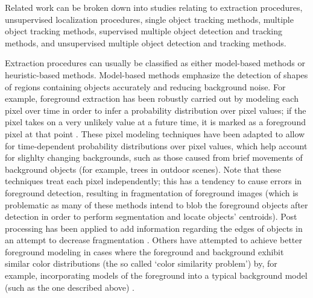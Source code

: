 \documentclass{article}
\begin{document}
Related work can be broken down into studies relating to extraction procedures, unsupervised localization procedures, single object tracking methods, multiple object tracking methods, supervised multiple object detection and tracking methods, and unsupervised multiple object detection and tracking methods.

Extraction procedures can usually be classified as either model-based methods or heuristic-based methods. Model-based methods emphasize the detection of shapes of regions containing objects accurately and reducing background noise. For example, foreground extraction has been robustly carried out by modeling each pixel over time in order to infer a probability distribution over pixel values; if the pixel takes on a very unlikely value at a future time, it is marked as a foreground pixel at that point \citep{stauffer_1999, elgammal_2000, elgammal_2002}. These pixel modeling techniques have been adapted to allow for time-dependent probability distributions over pixel values, which help account for slighlty changing backgrounds, such as those caused from brief movements of background objects (for example, trees in outdoor scenes). Note that these techniques treat each pixel independently; this has a tendency to cause errors in foreground detection, resulting in fragmentation of foreground images (which is problematic as many of these methods intend to blob the foreground objects after detection in order to perform segmentation and locate objects' centroids). Post processing has been applied to add information regarding the edges of objects in an attempt to decrease fragmentation \citep{turdu_2007}. Others have attempted to achieve better foreground modeling in cases where the foreground and background exhibit similar color distributions (the so called `color similarity problem') by, for example, incorporating models of the foreground into a typical background model (such as the one described above) \citep{gallego_2009, mchugh_2009}.
\end{document}
